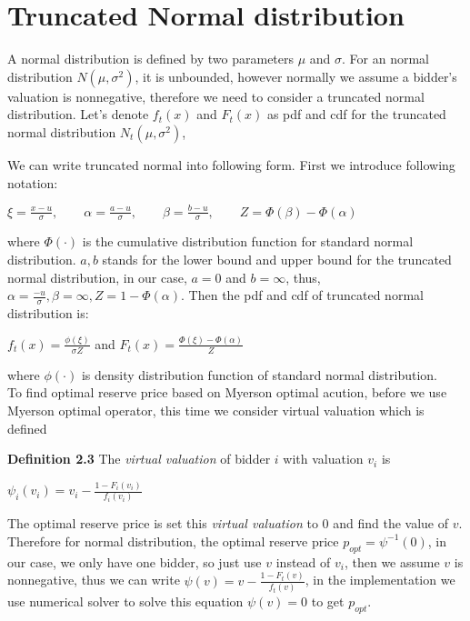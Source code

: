 \section{Truncated Normal distribution} \label{Normal distribution} 
A normal distribution is defined by two parameters $\mu$ and $\sigma$.
For an normal distribution $N(\mu, \sigma^2)$, it is unbounded, however normally we assume a bidder's valuation is nonnegative, therefore we need to consider a truncated normal distribution. Let's denote $f_t(x)$ and $F_t(x)$ as pdf and cdf for the truncated normal distribution $N_t(\mu, \sigma^2)$, 

We can write truncated normal into following form. First we introduce following notation:
\begin{center}
	$\xi = \frac{x-u}{\sigma}, \quad \quad \alpha = \frac{a - u}{\sigma},\quad \quad \beta = \frac{b-u}{\sigma}, \quad \quad Z = \Phi(\beta) - \Phi(\alpha)$ 
\end{center}
where $\Phi(\cdot)$ is the cumulative distribution function for standard normal distribution.
$a ,b$ stands for the lower bound and upper bound for the truncated normal distribution, in our case, $a = 0$ and $b = \infty$, thus, $ \alpha = \frac{- u}{\sigma}, \beta = \infty, Z = 1 - \Phi(\alpha)$. Then the pdf and cdf of truncated normal distribution is:
\begin{center}
	$f_t(x) = \frac{\phi(\xi)}{\sigma Z}$  \quad  and   \quad  $F_t(x) = \frac{\Phi(\xi) - \Phi(\alpha)}{Z}$ 
\end{center}

where $\phi (\cdot)$ is density distribution function of standard normal distribution.\\
To find optimal reserve price based on Myerson optimal acution, before we use Myerson optimal operator, this time we consider virtual valuation which is defined

\textbf{Definition 2.3} The \textit{virtual valuation} of bidder $i$ with valuation $v_i$ is 
\begin{center}
	$\psi_i(v_i) = v_i - \frac{1-F_i(v_i)}{f_i(v_i)}$ 
\end{center}

The optimal reserve price is set this \textit{virtual valuation} to 0 and find the value of $v$. Therefore for normal distribution, the optimal reserve price $p_{opt} = \psi^{-1}(0)$, in our case, we only have one bidder, so just use $v$ instead of $v_i$, then we assume $v$ is nonnegative, thus we can write $\psi(v) = v - \frac{1-F_t (v)}{f_t (v)}$, in the implementation we use numerical solver to solve this equation $\psi(v) = 0$ to get $p_{opt}$.\\

